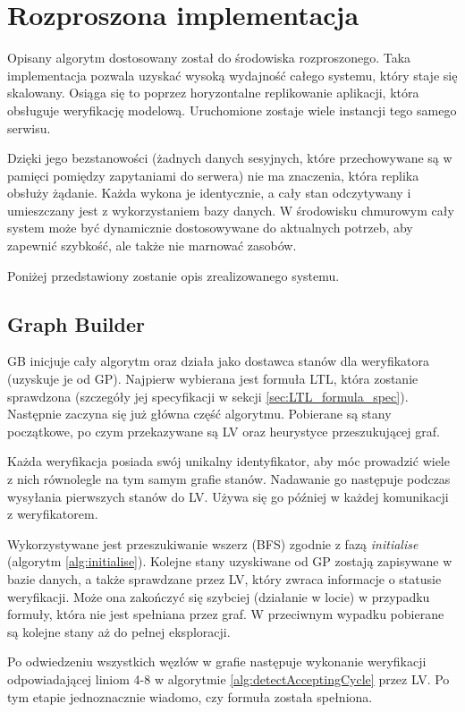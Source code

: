 \chapter{Rozproszona implementacja}

Opisany algorytm dostosowany został do środowiska rozproszonego.
Taka implementacja pozwala uzyskać wysoką wydajność całego systemu, który staje się skalowany.
Osiąga się to poprzez horyzontalne replikowanie aplikacji, która obsługuje weryfikację modelową.
Uruchomione zostaje wiele instancji tego samego serwisu.

Dzięki jego bezstanowości (żadnych danych sesyjnych, które przechowywane są w pamięci pomiędzy zapytaniami do serwera) nie ma znaczenia, która replika obsłuży żądanie.
Każda wykona je identycznie, a cały stan odczytywany i umieszczany jest z wykorzystaniem bazy danych.
W środowisku chmurowym cały system może być dynamicznie dostosowywane do aktualnych potrzeb, aby zapewnić szybkość, ale także nie marnować zasobów.

Poniżej przedstawiony zostanie opis zrealizowanego systemu.


\section{Graph Builder}

GB inicjuje cały algorytm oraz działa jako dostawca stanów dla weryfikatora (uzyskuje je od GP).
Najpierw wybierana jest formuła LTL, która zostanie sprawdzona (szczegóły jej specyfikacji w sekcji \ref{sec:LTL_formula_spec}).
Następnie zaczyna się już główna część algorytmu.
Pobierane są stany początkowe, po czym przekazywane są LV oraz heurystyce przeszukującej graf.

Każda weryfikacja posiada swój unikalny identyfikator, aby móc prowadzić wiele z nich równolegle na tym samym grafie stanów.
Nadawanie go następuje podczas wysyłania pierwszych stanów do LV.
Używa się go później w każdej komunikacji z weryfikatorem.

Wykorzystywane jest przeszukiwanie wszerz (BFS) zgodnie z fazą \textit{initialise} (algorytm \ref{alg:initialise}).
Kolejne stany uzyskiwane od GP zostają zapisywane w bazie danych, a także sprawdzane przez LV, który zwraca informacje o statusie weryfikacji.
Może ona zakończyć się szybciej (działanie w locie) w przypadku formuły, która nie jest spełniana przez graf.
W przeciwnym wypadku pobierane są kolejne stany aż do pełnej eksploracji.

Po odwiedzeniu wszystkich węzłów w grafie następuje wykonanie weryfikacji odpowiadającej liniom 4-8 w algorytmie \ref{alg:detectAcceptingCycle} przez LV.
Po tym etapie jednoznacznie wiadomo, czy formuła została spełniona.

